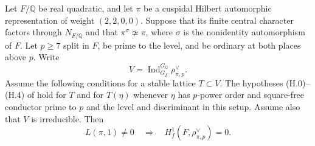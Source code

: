\begin{proposition}
\label{prop:lm-rational-hilbert}
Let $F/\mathbb Q$ be real quadratic, and let $\pi$ be a cuspidal Hilbert
automorphic representation of weight $(2,2,0,0)$.  Suppose that its
finite central character factors through $N_{F/\mathbb Q}$ and that
$\pi^\sigma\not\simeq\pi$, where $\sigma$ is the nonidentity automorphism
of $F$.  Let $p\geq7$ split in $F$, be prime to the level, and be ordinary
at both places above $p$.  Write
\[
 V=\operatorname{Ind}_{G_F}^{G_{\mathbb Q}}\rho_{\pi,p}^{\vee}.
\]
Assume the following conditions for a stable lattice $T\subset V$.
The hypotheses (H.0)--(H.4) of
\citet[\S3.5, pp.~27--28]{MazurRubin2004} hold for
$T$ and for $T(\eta)$ whenever $\eta$ has $p$-power order and square-free
conductor prime to $p$ and the level and discriminant in this setup.
Assume also that $V$ is irreducible.
Then
\[
 L(\pi,1)\ne0\quad\Longrightarrow\quad H^1_f(F,\rho_{\pi,p}^{\vee})=0.
\]
\end{proposition}

